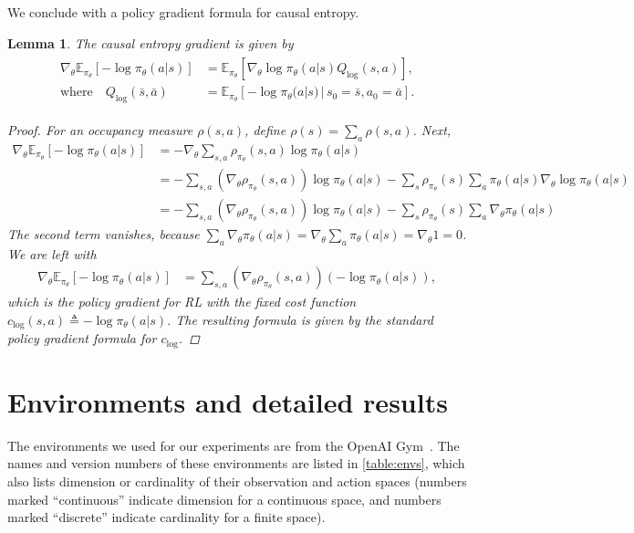 \documentclass{article}
\newtheorem{lemma}{Lemma}[section]
\newcommand\bbE{\ensuremath{\mathbb{E}}} %
\newcommand{\1}{\mathbb{I}} %
\begin{document}
We conclude with a policy gradient formula for causal entropy.
\begin{lemma} \label{entgrad}
The causal entropy gradient is given by
\begin{align}\begin{split}
\nabla_\theta \bbE_{\pi_\theta}[-\log \pi_\theta(a|s)] &= \bbE_{\pi_\theta} \left[\nabla_\theta \log\pi_\theta(a|s) Q_{\mathrm{log}}(s,a) \right], \\
\text{where}\quad Q_{\mathrm{log}}(\bar s,\bar a) &= \bbE_{\pi_\theta}[-\log\pi_\theta(a|s) \,|\, s_0=\bar s, a_0 = \bar a].
\end{split}\end{align}
\begin{proof}
For an occupancy measure $\rho(s,a)$, define $\rho(s) = \sum_a \rho(s,a)$. Next,
\begin{align*}
\nabla_\theta \bbE_{\pi_\theta}[-\log \pi_\theta(a|s)] &= -\nabla_\theta \sum_{s,a}\rho_{\pi_\theta}(s,a)\log \pi_\theta(a|s) \\
&= -\sum_{s,a} (\nabla_\theta \rho_{\pi_\theta}(s,a))\log \pi_\theta(a|s) - \sum_{s} \rho_{\pi_\theta}(s)\sum_a\pi_\theta(a|s)\nabla_\theta\log \pi_\theta(a|s) \\
&= -\sum_{s,a} (\nabla_\theta \rho_{\pi_\theta}(s,a))\log \pi_\theta(a|s) - \sum_{s} \rho_{\pi_\theta}(s)\sum_a\nabla_\theta \pi_\theta(a|s)
\end{align*}
The second term vanishes, because $\sum_a\nabla_\theta \pi_\theta(a|s) = \nabla_\theta \sum_a \pi_\theta(a|s) = \nabla_\theta 1 = 0$.
We are left with
\begin{align*}
\nabla_\theta \bbE_{\pi_\theta}[-\log \pi_\theta(a|s)] &= \sum_{s,a} (\nabla_\theta \rho_{\pi_\theta}(s,a))(-\log \pi_\theta(a|s)),
\end{align*}
which is the policy gradient for RL with the fixed cost function $c_\mathrm{log}(s,a) \triangleq -\log\pi_\theta(a|s)$. The resulting formula is given by the standard policy gradient formula for $c_\mathrm{log}$.
\end{proof}
\end{lemma}

\section{Environments and detailed results} \label{sec:envs}
The environments we used for our experiments are from the OpenAI Gym~\citep{gym}. The names and version numbers of these environments are listed in \cref{table:envs}, which also lists dimension or cardinality of their observation and action spaces (numbers marked ``continuous'' indicate dimension for a continuous space, and numbers marked ``discrete'' indicate cardinality for a finite space).
\end{document}
